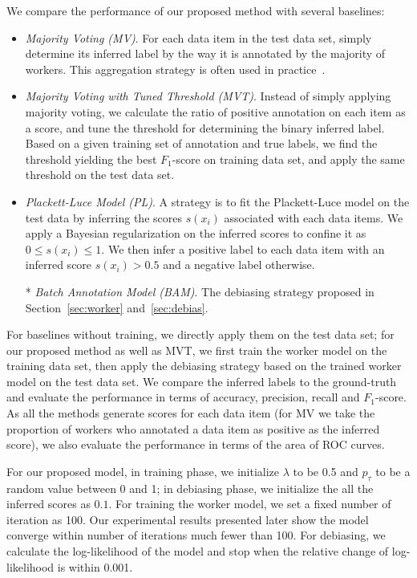 We compare the performance of our proposed method with several baselines:
\begin{itemize}
  \item \emph{Majority Voting (MV)}.
        For each data item in the test data set, 
        simply determine its inferred label by the way it is annotated by the majority of workers.  
        This aggregation strategy is often used in practice~\cite{sheng:kdd2008}.  %
  \item \emph{Majority Voting with Tuned Threshold (MVT)}.
        Instead of simply applying majority voting, 
        we calculate the ratio of positive annotation on each item as a score, 
        and tune the threshold for determining the binary inferred label.  
        Based on a given training set of annotation and true labels, 
        we find the threshold yielding the best $F_1$-score on training data set, 
        and apply the same threshold on the test data set.  
  \item \emph{Plackett-Luce Model (PL)}.  
        A strategy is to fit the Plackett-Luce model on the test data by inferring the scores $s(x_i)$ associated with each data items.  
        We apply a Bayesian regularization on the inferred scores to confine it as $0 \leq s(x_i) \leq 1$.  
        We then infer a positive label to each data item with an inferred score $s(x_i) > 0.5$ and a negative label otherwise.  
  \item[*] \emph{Batch Annotation Model (BAM)}.  
        The debiasing strategy proposed in Section~\ref{sec:worker} and~\ref{sec:debias}.
\end{itemize}

For baselines without training, we directly apply them on the test data set; 
for our proposed method as well as MVT, we first train the worker model on the training data set, 
then apply the debiasing strategy based on the trained worker model on the test data set.  
We compare the inferred labels to the ground-truth and evaluate the performance in terms of accuracy, precision, recall and $F_1$-score.  
As all the methods generate scores for each data item 
(for MV we take the proportion of workers who annotated a data item as positive as the inferred score),
we also evaluate the performance in terms of the area of ROC curves.  

For our proposed model, 
in training phase, we initialize $\lambda$ to be 0.5 and $p_{\tau}$ to be a random value between 0 and 1;
in debiasing phase, we initialize the all the inferred scores as $0.1$. 
For training the worker model, we set a fixed number of iteration as 100.  
Our experimental results presented later show the model converge within number of iterations much fewer than 100.  
For debiasing, we calculate the log-likelihood of the model and stop when the relative change of log-likelihood is within 0.001.  



